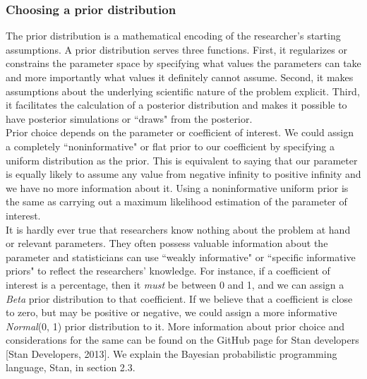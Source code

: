 \documentclass{article}
\begin{document}
\subsubsection{Choosing a prior distribution}
The prior distribution is a mathematical encoding of the researcher's starting assumptions. A prior distribution serves three functions. First, it regularizes or constrains the parameter space by specifying what values the parameters can take and more importantly what values it definitely cannot assume. Second, it makes assumptions about the underlying scientific nature of the problem explicit. Third, it facilitates the calculation of a posterior distribution and makes it possible to have posterior simulations or ``draws" from the posterior. \\
Prior choice depends on the parameter or coefficient of interest.  We could assign a completely ``noninformative" or flat prior to our coefficient by specifying a uniform distribution as the prior. This is equivalent to saying that our parameter is equally likely to assume any value from negative infinity to positive infinity and we have no more information about it. Using a noninformative uniform prior is the same as carrying out a maximum likelihood estimation of the parameter of interest. \\
It is hardly ever true that researchers know nothing about the problem at hand or relevant parameters. They often possess valuable information about the parameter and statisticians can use ``weakly informative" or ``specific informative priors" to reflect the researchers' knowledge. For instance, if a coefficient of interest is a percentage, then it \emph{must} be between 0 and 1, and we can assign a \emph{Beta} prior distribution to that coefficient.  If we believe that a coefficient is close to zero, but may be positive or negative, we could assign a more informative \emph{Normal}(0, 1) prior distribution to it.  More information about prior choice and considerations for the same can be found on the GitHub page for Stan developers [Stan Developers, 2013]. We explain the Bayesian probabilistic programming language, Stan, in section 2.3.\\
\end{document}
